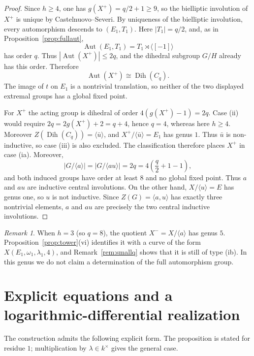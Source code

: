 \documentclass[11pt]{article}
\theoremstyle{remark}
\newtheorem{remark}[theorem]{Remark}
\newcommand{\Aut}{\operatorname{Aut}}
\newcommand{\Dih}{\operatorname{Dih}}
\begin{document}
\begin{proof}
Since $h\ge4$, one has $g(X^+)=q/2+1\ge9$, so the bielliptic involution
of $X^+$ is unique by Castelnuovo--Severi.  By uniqueness of the
bielliptic involution, every automorphism descends to
$(E_1,T_1)$.  Here $|T_1|=q/2$, and, as in
Proposition~\ref{prop:fullaut},
\[
        \Aut(E_1,T_1)=T_1\rtimes\langle[-1]\rangle
\]
has order $q$.  Thus $|\Aut(X^+)|\le2q$, and the dihedral subgroup
$G/H$ already has this order.  Therefore
\[
 \Aut(X^+)\cong\Dih(C_q).
\]
The image of $t$ on $E_1$ is a nontrivial translation, so neither of the
two displayed extremal groups has a global fixed point.

For $X^+$ the acting group is dihedral of order
$4(g(X^+)-1)=2q$.  Case \textup{(ii)} would require
$2q=2g(X^+)+2=q+4$, hence $q=4$, whereas here $h\ge4$.  Moreover
$Z(\Dih(C_q))=\langle\bar u\rangle$, and
$X^+/\langle\bar u\rangle=E_1$ has genus $1$.  Thus $\bar u$ is
non-inductive, so case \textup{(iii)} is also excluded.  The
classification therefore places $X^+$ in case \textup{(ia)}.
Moreover,
\[
 |G/\langle a\rangle|
 =|G/\langle au\rangle|
 =2q
 =4\left(\frac q2+1-1\right),
\]
and both induced groups have order at least $8$ and no global fixed point.
Thus $a$ and $au$ are inductive central involutions.  On the other hand,
$X/\langle u\rangle=E$ has genus one, so $u$ is not inductive.  Since
$Z(G)=\langle a,u\rangle$ has exactly three nontrivial elements, $a$ and
$au$ are precisely the two central inductive involutions.

\end{proof}

\begin{remark}\label{rem:central-h3}
When $h=3$ (so $q=8$), the quotient $X^-=X/\langle a\rangle$ has genus
$5$.  Proposition~\ref{prop:tower}(vi) identifies it with a curve of the
form $X(E_1,\omega_1,\lambda_1,4)$, and Remark~\ref{rem:smallq} shows
that it is still of type \textup{(ib)}.  In this genus we do not claim a
determination of the full automorphism group.
\end{remark}

\section{Explicit equations and a logarithmic-differential realization}\label{sec:explicit}

The construction admits the following explicit form.  The proposition is stated for residue $1$; multiplication by $\lambda\in k^\times$ gives the general case.
\end{document}
